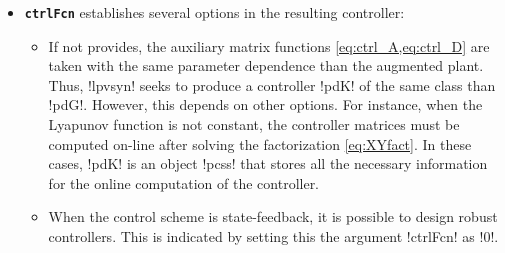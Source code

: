 \documentclass[fleqn,11pt]{article}
\newcommand{\lcode}[1]{\textbf{%
    \lstinline[style=mystyle]{#1}}}
\newcommand{\p}{\rho}
\newcommand{\Xu}{\mathbf{X}}
\newcommand{\Yu}{\mathbf{Y}}
\newcommand{\lpvtool}{\textbf{LPVtools}\xspace}
\begin{document}
\begin{itemize}
\begin{itemize}
        \item Finally, general Lyapunov functions of the form
            \begin{align*}
                \Xu(\p) &= \Xu_0 + \sum_{i=1}^{n_x}h_i(\p)\,\Xu_i, & \Yu(\p) &= \Yu_0 + \sum_{i=1}^{n_y}q_i(\p)\,\Yu_i,\\
                \dot\Xu(\p) &= \sum_{i=1}^{n_x}\frac{dh_i(\p)}{d\p}\dot{\p}\,\Xu_i, &
                \dot\Yu(\p) &= \sum_{i=1}^{n_y}\frac{dq_i(\p)}{d\p}\dot{\p}\,\Yu_i.
            \end{align*}
            can be used by defining !lyapFcn! as a struct such as:
\begin{code}
lyapFcn.parfcnX;
lyapFcn.dparfcnX;
lyapFcn.parfcnY;
lyapFcn.dparfcnY;
\end{code}
            where each field must be anonymous functions corresponding to $h_i(\p)$, $q_i(\p)$, $dh_i(\p)/d\p$, and $dq_i(\p)/d\p$. In this case, the optimization must be solved using gridding in order to have a finite number of LMIs. To ease the struct definition, \lpvtool includes the function !createLyapFcn!.
        \end{itemize}

        Notice that when a state-feedback is used, only the matrix function $\Yu(\p)$ need to be defined.

        \item \lcode{ctrlFcn} establishes several options in the resulting controller:
            \begin{itemize}
              \item If not provides, the auxiliary matrix functions \cref{eq:ctrl_A,eq:ctrl_D} are taken with the same parameter dependence than the augmented plant. Thus, !lpvsyn! seeks to produce a controller !pdK! of the same class than !pdG!. However, this depends on other options. For instance, when the Lyapunov function is not constant, the controller matrices must be computed on-line after solving the factorization \cref{eq:XYfact}. In these cases, !pdK! is an object !pcss! that stores all the necessary information for the online computation of the controller.

              \item When the control scheme is state-feedback, it is possible to design robust controllers. This is indicated by setting this the argument !ctrlFcn! as !0!.


\end{itemize}
\end{itemize}
\end{document}

